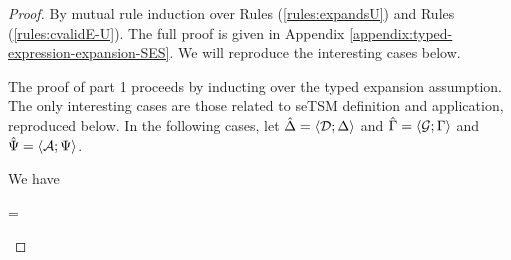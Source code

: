 \begin{proof}
By mutual rule induction over Rules (\ref{rules:expandsU}) and Rules (\ref{rules:cvalidE-U}). The full proof is given in Appendix \ref{appendix:typed-expression-expansion-SES}. We will reproduce the interesting cases below. 

The proof of part 1 proceeds by inducting over the typed expansion assumption. The only interesting cases are those related to seTSM definition and application, reproduced below. In the following cases, let $\hat{\Delta}=\langle \mathcal{D}; \Delta \rangle$ and $\hat{\Gamma}=\langle \mathcal{G}; \Gamma \rangle$ and $\hat{\Psi}=\langle \mathcal{A}; \Psi \rangle$.

\begin{byCases}
\item[\text{(\ref{rule:expandsU-syntax})}] We have 
\begin{pfsteps}
  \item \ue= 
  \item {}  
 \item \hastypeU{\emptyset}{\emptyset}{\eparse}{\aparr{\tBody}{\tParseResultExp}} 
  \item {} 
 \item {}  
  \item {} 
\end{pfsteps}
\resetpfcounter 


\end{byCases}
\end{proof}
